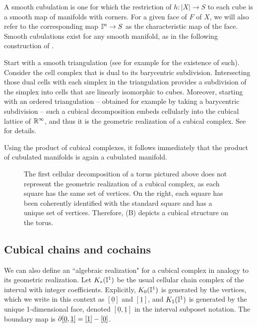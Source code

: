 \begin{comment}
	We abuse notation and write $h \circ \iota_{|\sigma|}$ simply as $\iota_\sigma$ for any $\sigma \in X$ when a cubical structure $h \colon |X| \to S$ is understood.
\end{comment}

A smooth cubulation is one for which the restriction of $h \colon |X| \to S$ to each cube is a smooth map of manifolds with corners.
For a given face of $F$ of $X$, we will also refer to the corresponding map $\mathbb{I}^n \to S$ as the characteristic map of the face.
Smooth cubulations exist for any smooth manifold, as in the following construction of \cite{ShSh92}.

Start with a smooth triangulation (see for example \cite[Theorem 10.6]{MUNK66} for the existence of such).
Consider the cell complex that is dual to its barycentric subdivision.
Intersecting those dual cells with each simplex in the triangulation provides a subdivision of the simplex into cells that are linearly isomorphic to cubes.
Moreover, starting with an ordered triangulation -- obtained for example by taking a barycentric subdivision -- such a cubical decomposition embeds cellularly into the cubical lattice of $\mathbb{R}^\infty$, and thus it is the geometric realization of a cubical complex.
See \cite{ShSh92} for details.

Using the product of cubical complexes, it follows immediately that the product of cubulated manifolds is again a cubulated manifold.

\begin{figure}
	
	\caption{The first cellular decomposition of a torus pictured above does not represent the geometric realization of a cubical complex, as each square has the same set of vertices.
		On the right, each square has been coherently identified with the standard square and has a unique set of vertices.
		Therefore, (B) depicts a cubical structure on the torus.}
	\label{F: cubical structure}
\end{figure}

\subsection{Cubical chains and cochains}\label{S: cubical cochains}

We can also define an ``algebraic realization" for a cubical complex in analogy to its geometric realization.
Let $K_*(\mathbb{I}^1)$ be the usual cellular chain complex of the interval with integer coefficients.
Explicitly, $K_0(\mathbb{I}^1)$ is generated by the vertices, which we write in this context as $[\underline{0}]$ and $[\underline{1}]$, and $K_1(\mathbb{I}^1)$ is generated by the unique 1-dimensional face, denoted $[\underline{0},\underline{1}]$ in the interval subposet notation.
The boundary map is $\partial [\underline{0},\underline{1}] = [\underline{1}]-[\underline{0}]$.

